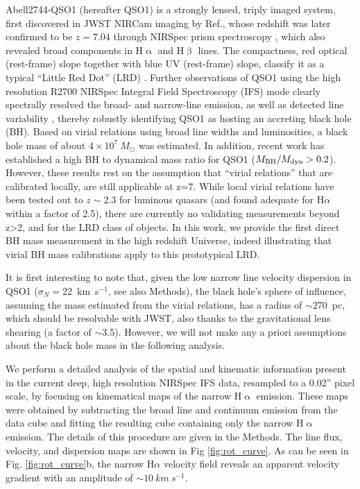 \documentclass[twocolumn, fleqn]{doc_class}
\newcommand{\Halpha}{\ensuremath{\mathrm{H}\upalpha}\xspace}
\newcommand{\Hbeta}{\ensuremath{\mathrm{H}\upbeta}\xspace}
\begin{document}
Abell2744-QSO1 (hereafter QSO1) is a strongly lensed, triply imaged system, first discovered in JWST NIRCam imaging by Ref., whose redshift was later confirmed to be $z=7.04$ through NIRSpec prism spectroscopy , which also revealed broad components in \Halpha and \Hbeta lines. The compactness, red optical (rest-frame) slope together with blue UV (rest-frame) slope, classify it as a typical ``Little Red Dot'' (LRD) . Further observations of QSO1 using the high resolution R2700 NIRSpec Integral Field Spectroscopy (IFS) mode  clearly spectrally resolved the broad- and narrow-line emission, as well as detected line variability , thereby robustly identifying QSO1 as hosting an accreting black hole (BH).
Based on virial relations using broad line widths and luminosities, a black hole mass of about $4\times 10^7~M_\odot$ was estimated.
In addition, recent work  has established a high BH to dynamical mass ratio for QSO1 ($M_{\rm BH}/M_{\rm dyn} > 0.2$). However, these results rest on the assumption that ``virial relations''  that are calibrated locally, are still applicable at z=7. While local virial relations have been tested out to $z\sim2.3$  for luminous quasars (and found adequate for H$\alpha$ within a factor of 2.5), there are currently no validating measurements beyond z>2, and for the LRD class of objects. In this work, we provide the first direct BH mass measurement in the high redshift Universe, indeed illustrating that virial BH mass calibrations apply to this prototypical LRD.

It is first interesting to note that, given the low narrow line velocity dispersion in QSO1 ($\sigma _N=22$~km~s$^{-1}$, see also Methods), the black hole's sphere of influence, assuming the mass estimated from the virial relations, has a radius of $\sim 270$~pc, which should be resolvable with JWST, also thanks to the gravitational lens shearing (a factor of $\sim$3.5). However, we will not make any a priori assumptions about the black hole mass in the following analysis.

We perform a detailed analysis of the spatial and kinematic information present in the current deep, high resolution NIRSpec IFS data, resampled to a 0.02'' pixel scale, by focusing on kinematical maps of the narrow \Halpha emission. These maps were obtained by subtracting the broad line and continuum emission from the data cube and fitting the resulting cube containing only the narrow \Halpha emission. The details of this procedure are given in the Methods. The line flux, velocity, and dispersion maps are shown in Fig \ref{fig:rot_curve}. As can be seen in Fig. \ref{fig:rot_curve}b, the narrow H$\alpha$ velocity field reveals an apparent velocity gradient  with an amplitude of $\sim  10~km~s^{-1}$.
\end{document}
